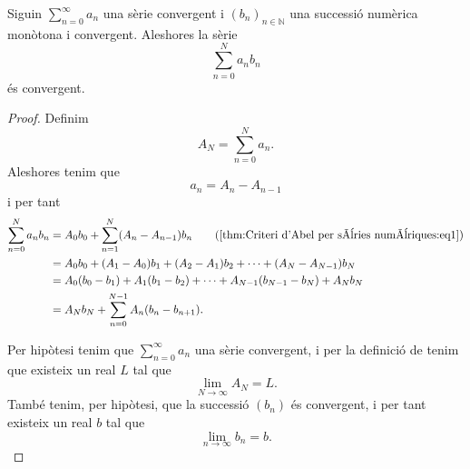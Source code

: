 \documentclass[../../Main.tex]{subfiles}
\begin{document}
	\begin{theorem}
		\label{thm:Criteri d'Abel per sèries numèriques}
		Siguin \(\sum_{n=0}^{\infty}a_{n}\) una sèrie convergent i \((b_{n})_{n\in\mathbb{N}}\) una successió numèrica monòtona i convergent. Aleshores la sèrie
		\[\sum_{n=0}^{N}a_{n}b_{n}\]
		és convergent.
		\begin{proof}
			Definim
			\[A_{N}=\sum_{n=0}^{N}a_{n}.\]
			Aleshores tenim que
			\begin{equation}
				\label{thm:Criteri d'Abel per sèries numèriques:eq1}
				a_{n}=A_{n}-A_{n-1}
			\end{equation}
			i per tant
			\begin{align*}
				\sum_{n=0}^{N}a_{n}b_{n}&=A_{0}b_{0}+\sum_{n=1}^{N}(A_{n}-A_{n-1})b_{n} \tag{\ref{thm:Criteri d'Abel per sèries numèriques:eq1}}\\
				&=A_{0}b_{0}+(A_{1}-A_{0})b_{1}+(A_{2}-A_{1})b_{2}+\dots+(A_{N}-A_{N-1})b_{N} \\
				&=A_{0}(b_{0}-b_{1})+A_{1}(b_{1}-b_{2})+\dots+A_{N-1}(b_{N-1}-b_{N})+A_{N}b_{N} \\
				&=A_{N}b_{N}+\sum_{n=0}^{N-1}A_{n}(b_{n}-b_{n+1}).
			\end{align*}
			
			Per hipòtesi tenim que \(\sum_{n=0}^{\infty}a_{n}\) una sèrie convergent, i per la definició de  tenim que existeix un real \(L\) tal que
			\begin{equation}
				\label{thm:Criteri d'Abel per sèries numèriques:eq2}
				\lim_{N\to\infty}A_{N}=L.
			\end{equation}
			També tenim, per hipòtesi, que la successió \((b_{n})\) és convergent, i per tant existeix un real \(b\) tal que %
			\begin{equation}
				\label{thm:Criteri d'Abel per sèries numèriques:eq4}
				\lim_{n\to\infty}b_{n}=b.
			\end{equation}
			

\end{proof}
\end{theorem}
\end{document}
